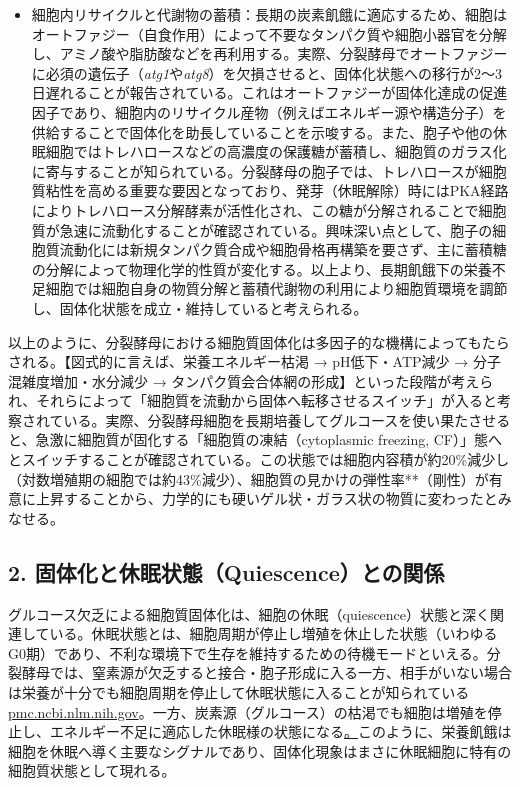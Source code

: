 \begin{itemize}
    \item 細胞内リサイクルと代謝物の蓄積：長期の炭素飢餓に適応するため、細胞はオートファジー（自食作用）によって不要なタンパク質や細胞小器官を分解し、アミノ酸や脂肪酸などを再利用する。実際、分裂酵母でオートファジーに必須の遺伝子（\textit{atg1}や\textit{atg8}）を欠損させると、固体化状態への移行が2〜3日遅れることが報告されている。これはオートファジーが固体化達成の促進因子であり、細胞内のリサイクル産物（例えばエネルギー源や構造分子）を供給することで固体化を助長していることを示唆する。また、胞子や他の休眠細胞ではトレハロースなどの高濃度の保護糖が蓄積し、細胞質のガラス化に寄与することが知られている。分裂酵母の胞子では、トレハロースが細胞質粘性を高める重要な要因となっており、発芽（休眠解除）時にはPKA経路によりトレハロース分解酵素が活性化され、この糖が分解されることで細胞質が急速に流動化することが確認されている。興味深い点として、胞子の細胞質流動化には新規タンパク質合成や細胞骨格再構築を要さず、主に蓄積糖の分解によって物理化学的性質が変化する。以上より、長期飢餓下の栄養不足細胞では細胞自身の物質分解と蓄積代謝物の利用により細胞質環境を調節し、固体化状態を成立・維持していると考えられる。
\end{itemize}
以上のように、分裂酵母における細胞質固体化は多因子的な機構によってもたらされる。【図式的に言えば、栄養エネルギー枯渇 → pH低下・ATP減少 → 分子混雑度増加・水分減少 → タンパク質会合体網の形成】といった段階が考えられ、それらによって「細胞質を流動から固体へ転移させるスイッチ」が入ると考察されている。実際、分裂酵母細胞を長期培養してグルコースを使い果たさせると、急激に細胞質が固化する「細胞質の凍結（cytoplasmic freezing, CF）」態へとスイッチすることが確認されている。この状態では細胞内容積が約20\%減少し（対数増殖期の細胞では約43\%減少）、細胞質の見かけの弾性率**（剛性）が有意に上昇することから、力学的にも硬いゲル状・ガラス状の物質に変わったとみなせる。

\subsection{2. 固体化と休眠状態（Quiescence）との関係}
グルコース欠乏による細胞質固体化は、細胞の休眠（quiescence）状態と深く関連している。休眠状態とは、細胞周期が停止し増殖を休止した状態（いわゆるG0期）であり、不利な環境下で生存を維持するための待機モードといえる。分裂酵母では、窒素源が欠乏すると接合・胞子形成に入る一方、相手がいない場合は栄養が十分でも細胞周期を停止して休眠状態に入ることが知られている\href{https://pmc.ncbi.nlm.nih.gov/articles/PMC6857596/\#:~:text=When\%20nutrients\%20become\%20growth\%20limiting,yeast\%20cells\%20that\%20have\%20slowly}{pmc.ncbi.nlm.nih.gov}。一方、炭素源（グルコース）の枯渇でも細胞は増殖を停止し、エネルギー不足に適応した休眠様の状態になる\href{https://pmc.ncbi.nlm.nih.gov/articles/PMC3123465/\#:~:text=stochastic\%2C\%20accompanied\%20by\%20a\%20curious,choline\%29\%2C\%20which\%20increased\%20or}。このように、栄養飢餓は細胞を休眠へ導く主要なシグナルであり、固体化現象はまさに休眠細胞に特有の細胞質状態として現れる。

